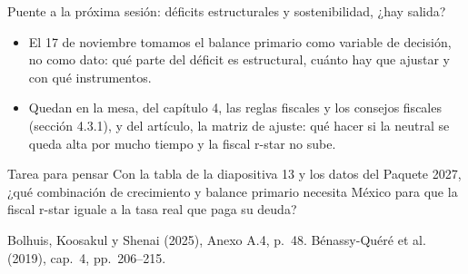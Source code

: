 \documentclass[aspectratio=169,11pt]{beamer}
\newcommand{\fuente}[1]{\par\vfill{\small\color{cGris}#1\par}}
\newcommand{\BKS}{Bolhuis, Koosakul y Shenai (2025)}
\begin{document}
\begin{frame}{Puente a la próxima sesión: déficits estructurales y sostenibilidad, ¿hay salida?}
  \begin{itemize}
    \item El 17 de noviembre tomamos el balance primario como variable de decisión, no como dato: qué parte del déficit es estructural, cuánto hay que ajustar y con qué instrumentos.
    \item Quedan en la mesa, del capítulo 4, las reglas fiscales y los consejos fiscales (sección 4.3.1), y del artículo, la matriz de ajuste: qué hacer si la neutral se queda alta por mucho tiempo y la fiscal r-star no sube.
  \end{itemize}
  \pause
  \begin{block}{Tarea para pensar}
    Con la tabla de la diapositiva 13 y los datos del Paquete 2027, ¿qué combinación de crecimiento y balance primario necesita México para que la fiscal r-star iguale a la tasa real que paga su deuda?
  \end{block}
  \fuente{\BKS, Anexo A.4, p.~48. Bénassy-Quéré et al. (2019), cap.~4, pp.~206--215.}
\end{frame}
\end{document}
